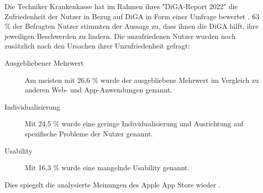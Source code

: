 \documentclass{article}
\begin{document}
			Die Techniker Krankenkasse hat im Rahmen ihres "DiGA-Report 2022" die Zufriedenheit der Nutzer in Bezug auf DiGA in Form einer Umfrage bewertet \cite[vgl. S. 53]{TK-diga-report-1}. 63 \% der Befragten Nutzer stimmten der Aussage zu, dass ihnen die DiGA hilft, ihre jeweiligen Beschwerden zu lindern. Die unzufriedenen Nutzer wurden noch zusätzlich nach den Ursachen ihrer Unzufriedenheit gefragt:
			\begin{description}
				\item[Ausgebliebener Mehrwert] Am meisten mit 26,6 \% wurde der ausgebliebene Mehrwert im Vergleich zu anderen Web- und App-Anwendungen genannt.
				\item[Individualisierung] Mit 24,5 \% wurde eine geringe Individualisierung und Ausrichtung auf spezifische Probleme der Nutzer genannt.
				\item[Usability] Mit 16,3 \% wurde eine mangelnde Usability genannt.    
			\end{description}
			Dies spiegelt die analysierte Meinungen des Apple App Store wieder \cite[vgl. Digitale Gesundheitsanwendungen: Akzeptanz bei den Nutzer*innen]{frauenhofinstitut}.                 
\end{document}
